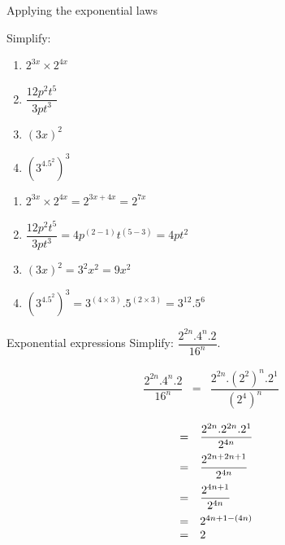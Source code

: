 \begin{wex}
{ %
Applying the exponential laws
}
{%
Simplify:

\begin{enumerate}[itemsep=6pt, label=\textbf{\arabic*}.]
\item  $2^{3x} \times 2^{4x}$
 \item $\dfrac{12p^2t^5}{3pt^3}$
 \item $ (3x)^2 $
 \item $(3^4.5^2)^3$\\
\end{enumerate}

}
{%

\begin{enumerate}[itemsep=6pt, label=\textbf{\arabic*}.]
\item  $2^{3x} \times 2^{4x} = 2^{3x+4x} = 2^{7x}$
 \item $\dfrac{12p^2t^5}{3pt^3} = 4p^{(2-1)}t^{(5-3)} = 4pt^2$
 \item $ (3x)^2 = 3^2x^2 = 9x^2$
 \item $(3^4.5^2)^3 = 3^{(4\times3)}.5^{(2\times3)} = 3^{12}.5^6  $
\end{enumerate}

}


\end{wex}


\begin{wex}
{
Exponential expressions
}
{
Simplify: $\dfrac{2^{2n} .4^n . 2 }{ 16^n}. $
}
{

\begin{eqnarray*}
\dfrac{2^{2n} . 4^n . 2 }{ 16^n} & = &\dfrac{2^{2n} . (2^2)^n . 2^1 }{ (2^4)^n} 
\end{eqnarray*}


\begin{equation*}
 \begin{array}{rcl}
   &= & \dfrac{ 2^{2n} . 2^{2n} . 2^1 }{ 2^{4n} } \vspace{5pt}\\
& = & \dfrac{ 2^{2n + 2n +1}}{2^{4n}} \vspace{5pt}\\
& = & \dfrac{2^{4n+1}}{2^{4n}} \vspace{5pt}\\
& = & 2^{4n+1-(4n)} \\
& = & 2
 \end{array}

\end{equation*}


 
}
\end{wex}


